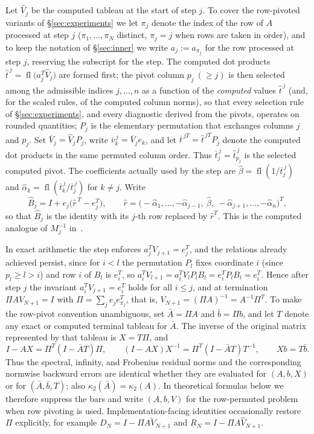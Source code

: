 \documentclass[review,onefignum,onetabnum]{siamart251216}
\newcommand{\fl}{\operatorname{fl}}
\begin{document}
Let $\widehat V_j$ be the computed tableau at the start of step $j$. To cover the row-pivoted
variants of \S\ref{sec:experiments} we let $\pi_j$ denote the index of the row of $A$
processed at step $j$ ($\pi_1,\dots,\pi_N$ distinct, $\pi_j=j$ when rows are taken in order),
and to keep the notation of \S\ref{sec:inner} we write $a_j := a_{\pi_j}$ for the row
processed at step $j$, reserving the subscript for the step. The computed dot products
$\hat t^{\,j} = \fl\bigl(a_j^T\widehat V_j\bigr)$ are formed first; the pivot column
$p_j\ (\ge j)$ is then selected among the admissible indices $j,\dots,n$ as a function of the
\emph{computed} values $\hat t^{\,j}$ (and, for the scaled rules, of the computed column
norms), so that every selection rule of \S\ref{sec:experiments}, and every diagnostic
derived from the pivots, operates on rounded quantities; $P_j$ is the elementary permutation
that exchanges columns $j$ and $p_j$. Set
$\overline V_j=\widehat V_jP_j$, write $\overline v_k^{\,j}=\overline V_je_k$, and let
$\overline t^{\,jT}=\hat t^{\,jT}P_j$ denote the computed dot products in the same permuted
column order. Thus $\overline t_j^{\,j}=\hat t_{p_j}^{\,j}$ is the selected computed pivot. The
coefficients actually used by the step are
$\hat\beta=\fl(1/\overline t_j^{\,j})$ and
$\hat\alpha_k=\fl(\overline t_k^{\,j}/\overline t_j^{\,j})$ for $k\ne j$. Write
%
\begin{equation}\label{eq:Bhat}
\widehat B_j = I + e_j\bigl(\hat r^{\,T}-e_j^T\bigr),
\qquad
\hat r = \bigl(-\hat\alpha_1,\dots,-\hat\alpha_{j-1},\ \hat\beta,\
-\hat\alpha_{j+1},\dots,-\hat\alpha_n\bigr)^T ,
\end{equation}
%
so that $\widehat B_j$ is the identity with its $j$-th row replaced by $\hat r^T$. This is
the computed analogue of $M_j^{-1}$ in~\cite[Eq.~(2.3)]{CastilloCJPC2000}.

In exact arithmetic the step enforces $a_j^TV_{j+1}=e_j^T$, and the relations already achieved
persist, since for $i<l$ the permutation $P_l$ fixes coordinate $i$ (since $p_l\ge l>i$) and row $i$
of $B_l$ is $e_i^T$, so $a_i^TV_{l+1}=a_i^TV_lP_lB_l=e_i^TP_lB_l=e_i^T$. Hence after step $j$
the invariant $a_i^TV_{j+1}=e_i^T$ holds for all $i\le j$, and at termination
$\Pi A V_{N+1}=I$ with $\Pi=\sum_{j}e_je_{\pi_j}^T$, that is,
$V_{N+1}=(\Pi A)^{-1}=A^{-1}\Pi^T$. To make the row-pivot convention unambiguous, set
$\bar A=\Pi A$ and $\bar b=\Pi b$, and let $T$ denote any exact or computed terminal tableau for
$\bar A$. The inverse of the original matrix represented by that tableau is $X=T\Pi$, and
\[
I-AX=\Pi^T(I-\bar A T)\Pi,
\qquad
(I-AX)X^{-1}=\Pi^T(I-\bar A T)T^{-1},
\qquad
Xb=T\bar b.
\]
Thus the spectral, infinity, and Frobenius residual norms and the corresponding normwise backward
errors are identical whether they are evaluated for $(A,b,X)$ or for $(\bar A,\bar b,T)$; also
$\kappa_2(\bar A)=\kappa_2(A)$. In theoretical formulas below we therefore suppress the bars and
write $(A,b,V)$ for the row-permuted problem when row pivoting is used. Implementation-facing
identities occasionally restore $\Pi$ explicitly, for example
$D_N=I-\Pi A\widetilde V_{N+1}$ and $R_N=I-\Pi A\widehat V_{N+1}$.
\end{document}
